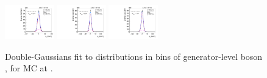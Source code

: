 \begin{figure}[htb]
\includegraphics[width=0.19\textwidth]{plots/Appendix_Recoil_Fits/WmpMC_PF_13TeV_2G/pfu2fit_32.pdf}
\includegraphics[width=0.19\textwidth]{plots/Appendix_Recoil_Fits/WmpMC_PF_13TeV_2G/pfu2fit_33.pdf}
\includegraphics[width=0.19\textwidth]{plots/Appendix_Recoil_Fits/WmpMC_PF_13TeV_2G/pfu2fit_34.pdf}
\caption{Double-Gaussians fit to \uprp distributions in bins of generator-level boson \pt, for \Wp MC at \serah.}
\label{fig:a:recoil:fit:wp:u2:13}
\end{figure}